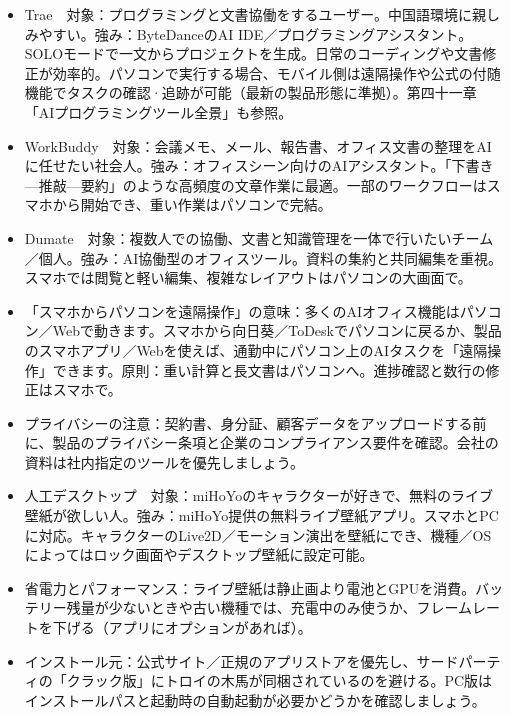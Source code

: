 
\begin{itemize}
  \item Trae　対象：プログラミングと文書協働をするユーザー。中国語環境に親しみやすい。強み：ByteDanceのAI IDE／プログラミングアシスタント。SOLOモードで一文からプロジェクトを生成。日常のコーディングや文書修正が効率的。パソコンで実行する場合、モバイル側は遠隔操作や公式の付随機能でタスクの確認·追跡が可能（最新の製品形態に準拠）。第四十一章「AIプログラミングツール全景」も参照。
  \item WorkBuddy　対象：会議メモ、メール、報告書、オフィス文書の整理をAIに任せたい社会人。強み：オフィスシーン向けのAIアシスタント。「下書き—推敲—要約」のような高頻度の文章作業に最適。一部のワークフローはスマホから開始でき、重い作業はパソコンで完結。
  \item Dumate　対象：複数人での協働、文書と知識管理を一体で行いたいチーム／個人。強み：AI協働型のオフィスツール。資料の集約と共同編集を重視。スマホでは閲覧と軽い編集、複雑なレイアウトはパソコンの大画面で。
  \item 「スマホからパソコンを遠隔操作」の意味：多くのAIオフィス機能はパソコン／Webで動きます。スマホから向日葵／ToDeskでパソコンに戻るか、製品のスマホアプリ／Webを使えば、通勤中にパソコン上のAIタスクを「遠隔操作」できます。原則：重い計算と長文書はパソコンへ。進捗確認と数行の修正はスマホで。
  \item プライバシーの注意：契約書、身分証、顧客データをアップロードする前に、製品のプライバシー条項と企業のコンプライアンス要件を確認。会社の資料は社内指定のツールを優先しましょう。
\end{itemize}


\begin{itemize}
  \item 人工デスクトップ　対象：miHoYoのキャラクターが好きで、無料のライブ壁紙が欲しい人。強み：miHoYo提供の無料ライブ壁紙アプリ。スマホとPCに対応。キャラクターのLive2D／モーション演出を壁紙にでき、機種／OSによってはロック画面やデスクトップ壁紙に設定可能。
  \item 省電力とパフォーマンス：ライブ壁紙は静止画より電池とGPUを消費。バッテリー残量が少ないときや古い機種では、充電中のみ使うか、フレームレートを下げる（アプリにオプションがあれば）。
  \item インストール元：公式サイト／正規のアプリストアを優先し、サードパーティの「クラック版」にトロイの木馬が同梱されているのを避ける。PC版はインストールパスと起動時の自動起動が必要かどうかを確認しましょう。
\end{itemize}

